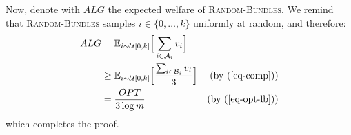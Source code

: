 Now, denote with $ALG$ the expected welfare of 
\textsc{Random-Bundles}. We remind that \textsc{Random-Bundles} samples $i\in \{0,\ldots,k\}$ uniformly at random, and therefore:
\begin{align*}
     ALG &=  \mathbb{E}_{i \sim \mathcal{U}[0, k]} \Big[\sum_{i \in \mathcal A_i} v_i\Big] \\
& \ge \mathbb{E}_{i \sim \mathcal{U}[0, k]} \Big[\frac{\sum_{i \in \mathcal B_i} v_i}{3}\Big] &\text{(by (\ref{eq-comp}))} \\
 &= \frac{OPT}{3\log m} &\text{(by (\ref{eq-opt-lb}))} 
\end{align*}
which completes the proof. 









